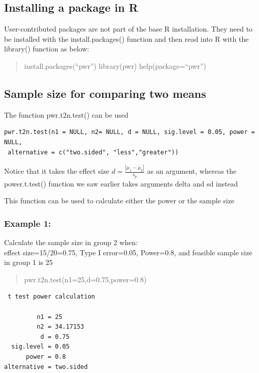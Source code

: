 \documentclass[
]{book}
\begin{document}
\hypertarget{installing-a-package-in-r}{%
\subsection{Installing a package in R}\label{installing-a-package-in-r}}

User-contributed packages are not part of the base R installation. They need to be installed with the install.packages() function and then read into R with the library() function as below:

\begin{quote}
install.packages(``pwr'')
library(pwr)
help(package=``pwr'')
\end{quote}

\hypertarget{sample-size-for-comparing-two-means}{%
\subsection{Sample size for comparing two means}\label{sample-size-for-comparing-two-means}}

The function pwr.t2n.test() can be used

\begin{verbatim}
pwr.t2n.test(n1 = NULL, n2= NULL, d = NULL, sig.level = 0.05, power = NULL,  
 alternative = c("two.sided", "less","greater"))
\end{verbatim}

Notice that it takes the effect size \(d=\frac{|\mu_1-\mu_2|}{s_p}\) as an argument, whereas the power.t.test() function we saw earlier takes arguments delta and sd instead

This function can be used to calculate either the power or the sample size

\hypertarget{example-1-2}{%
\subsubsection{Example 1:}\label{example-1-2}}

Calculate the sample size in group 2 when:\\
effect size=15/20=0.75, Type I error=0.05, Power=0.8, and feasible sample size in group 1 is 25

\begin{quote}
pwr.t2n.test(n1=25,d=0.75,power=0.8)
\end{quote}

\begin{verbatim}
 t test power calculation 

         n1 = 25
         n2 = 34.17153
          d = 0.75
  sig.level = 0.05
      power = 0.8
alternative = two.sided
\end{verbatim}
\end{document}
